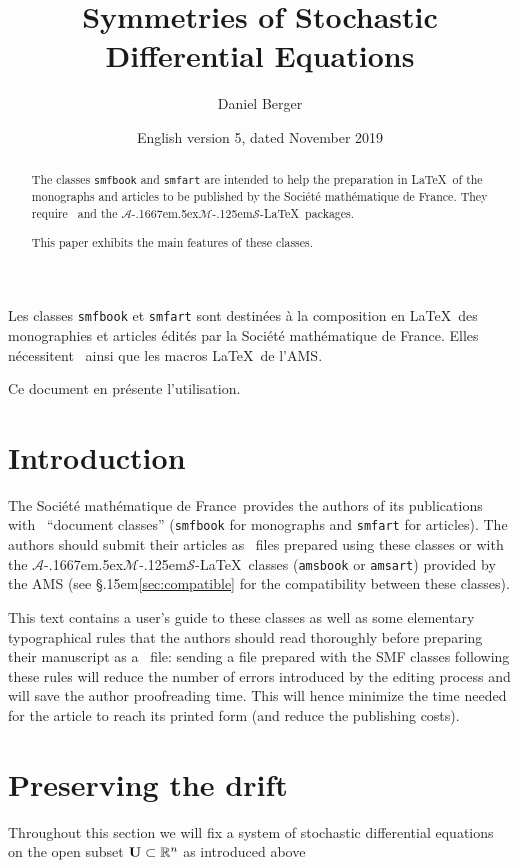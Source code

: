 \documentclass[11pt,english]{smfart}
\title{Symmetries of Stochastic Differential Equations}
\date {English version 5, dated November 2019}
\author{Daniel Berger}
\newcommand{\SmF}{Soci\'et\'e ma\-th\'e\-ma\-ti\-que de France}
\newcommand{\T}{\S\kern .15em\relax }
\newcommand{\AMS}{$\mathcal{A}$\kern-.1667em\lower.5ex\hbox
        {$\mathcal{M}$}\kern-.125em$\mathcal{S}$}
\newcommand{\U}{{\bf{U}}}
\begin{document}
\def\smfbyname{}

\begin{abstract}
The classes \texttt{smfbook} and \texttt{smfart} are intended to help the preparation in \LaTeX\ of the monographs and articles to be published by the \SmF. They require \LaTeXe\ and the \AMS-\LaTeX\ packages.\par
This paper exhibits the main features of these classes.
\end{abstract}

\begin{altabstract}
Les classes \texttt{smfbook} et \texttt{smfart} sont destin\'ees \`a la composition en \LaTeX\ des monographies et articles \'edit\'es par la \SmF. Elles n\'ecessitent \LaTeXe\ ainsi que les macros \LaTeX\ de l'AMS.\par
Ce document en pr\'esente l'utilisation.
\end{altabstract}
\maketitle

\tableofcontents

\section{Introduction}
The \SmF\ provides the authors of its publications with \LaTeXe\ ``document classes'' (\texttt{smfbook} for monographs and \texttt{smfart} for articles). The authors should submit their articles as \LaTeXe\ files prepared using these classes or with the \AMS-\LaTeX\ classes (\texttt{amsbook} or \texttt{amsart}) provided by the AMS (see \T\ref{sec:compatible} for the compatibility between these classes).

This text contains a user's guide to these classes as well as some elementary typographical rules that the authors should read thoroughly before preparing their manuscript as a \LaTeXe\ file: sending a file prepared with the SMF classes following these rules will reduce the number of errors introduced by the editing process and will save the author proofreading time. This will hence minimize the time needed for the article to reach its printed form (and reduce the publishing costs).


\section{Preserving the drift}
Throughout this section we will fix a system of stochastic differential equations on the open subset $\U\subset \mathbb{R}^{n}$ as introduced above
\end{document}

